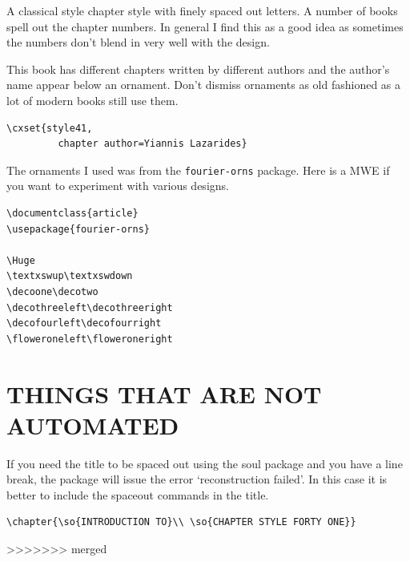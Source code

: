 A classical style chapter style with finely spaced out letters. A number of books spell out the chapter numbers. In general I find this as a good idea as sometimes the numbers don't blend in very well with the design.

\begin{figure}[ht]
\centering
{}
\end{figure}

This book has different chapters written by different authors and the author's name appear below an ornament. Don't dismiss ornaments as old fashioned as a lot of modern books still use them.

\begin{lstlisting}
\cxset{style41,
         chapter author=Yiannis Lazarides}
\end{lstlisting}

The ornaments I used was from the \texttt{fourier-orns} package. Here is a MWE if you want to experiment with various designs.


\begin{lstlisting}
\documentclass{article}
\usepackage{fourier-orns}

\Huge
\textxswup\textxswdown
\decoone\decotwo
\decothreeleft\decothreeright
\decofourleft\decofourright
\floweroneleft\floweroneright

\end{lstlisting}

\section{THINGS THAT ARE NOT AUTOMATED}

If you need the title to be spaced out using the soul package and you have a line break, the package will issue the error `reconstruction failed'. In this case it is better to include the spaceout commands in the title.


\begin{verbatim}
\chapter{\so{INTRODUCTION TO}\\ \so{CHAPTER STYLE FORTY ONE}}
\end{verbatim}

>>>>>>> merged
